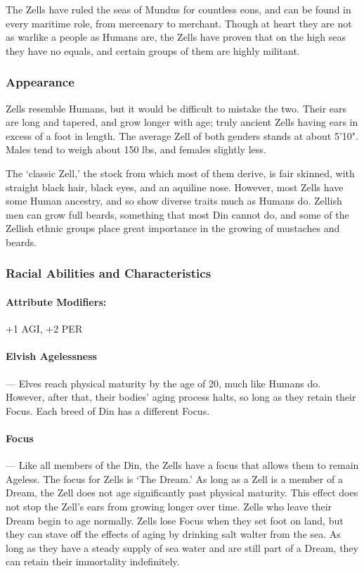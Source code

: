\documentclass[oneside,11pt,english]{book}
\begin{document}
The Zells have ruled the seas of Mundus for countless eons, and can be found in every maritime role, from mercenary to merchant. Though at heart they are not as warlike a people as Humans are, the Zells have proven that on the high seas they have no equals, and certain groups of them are highly militant.


\subsubsection*{Appearance} 
Zells resemble Humans, but it would be difficult to mistake the two. Their ears are long and tapered, and grow longer with age; truly ancient Zells having ears in excess of a foot in length. 
The average Zell of both genders stands at about 5'10". Males tend to weigh about 150 lbs, and females slightly less.


The ‘classic Zell,’ the stock from which most of them derive, is fair skinned, with straight black hair, black eyes, and an aquiline nose. However, most Zells have some Human ancestry, and so show diverse traits much as Humans do. Zellish men can grow full beards, something that most Din cannot do, and some of the Zellish ethnic groups place great importance in the growing of mustaches and beards.


\subsubsection*{Racial Abilities and Characteristics} 
\paragraph{Attribute Modifiers:} +1 AGI, +2 PER 

\paragraph{Elvish Agelessness}---\quad
Elves reach physical maturity by the age of 20, much like Humans do. However, after that, their 
bodies' aging process halts, so long as they retain their Focus. Each breed of Din has a different 
Focus. 


\paragraph{Focus}---\quad
Like all members of the Din, the Zells have a focus that allows them to remain Ageless. The focus for Zells is ‘The Dream.’ As long as a Zell is a member of a Dream, the Zell does not age significantly past physical maturity. This effect does not stop the Zell's ears from growing longer over time. Zells who leave their Dream begin to age normally. 
Zells lose Focus when they set foot on land, but they can stave off the effects of aging by drinking salt walter from the sea. As long as they have a steady supply of sea water and are still part of a Dream, they can retain their immortality indefinitely.
\end{document}
